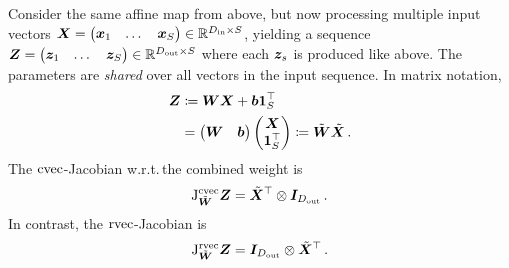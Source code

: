 \begin{example}
  Consider the same affine map from above, but now processing multiple input vectors ${\bm{X}} = \begin{pmatrix}{\bm{x}}_1 & \dots & {\bm{x}}_S\end{pmatrix} \in {\mathbb{R}}^{D_{\text{in}}\times S}$, yielding a sequence ${\bm{Z}} = \begin{pmatrix} {\bm{z}}_1 & \dots & {\bm{z}}_S\end{pmatrix} \in {\mathbb{R}}^{D_{\text{out}}\times S}$ where each ${\bm{z}}_s$ is produced like above.
  The parameters are \emph{shared} over all vectors in the input sequence.
  In matrix notation,
  \begin{align*}
    {\bm{Z}}
     & \coloneqq
    {\bm{W}} {\bm{X}} + {\bm{b}} {\bm{1}}^{\top}_S
    \\
     & =
    \begin{pmatrix}
      {\bm{W}} & {\bm{b}}
    \end{pmatrix}
    \begin{pmatrix}
      {\bm{X}} \\ {\bm{1}}^{\top}_S
    \end{pmatrix}
    \coloneqq
    \tilde{{\bm{W}}}
    \tilde{{\bm{X}}}\,.
  \end{align*}
  The $\operatorname{cvec}$-Jacobian w.r.t.\,the combined weight is
  \begin{align*}
    \mathrm{J}^{\operatorname{cvec}}_{\tilde{{\bm{W}}}}{\bm{Z}}
    =
    \tilde{{\bm{X}}}^{\top}
    \otimes
    {\bm{I}}_{D_{\text{out}}}\,.
  \end{align*}
  In contrast, the $\operatorname{rvec}$-Jacobian is
  \begin{align*}
    \mathrm{J}^{\operatorname{rvec}}_{\tilde{{\bm{W}}}}{\bm{Z}}
    =
    {\bm{I}}_{D_{\text{out}}}
    \otimes
    \tilde{{\bm{X}}}^{\top}\,.
  \end{align*}
\end{example}

\switchcolumn[1]

